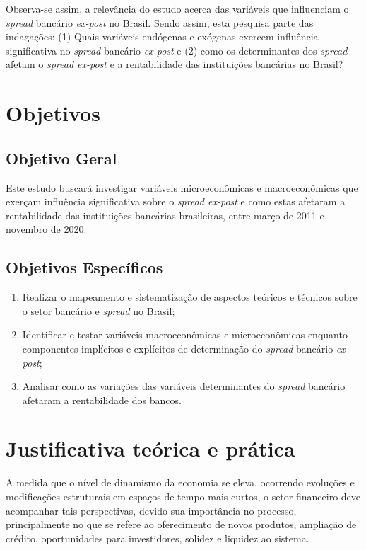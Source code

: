 \documentclass[
  12pt,
  12pt,
  openright,
  oneside,
  a4paper,
  chapter=TITLE,
  section=TITLE,
  subsection=TITLE,
  subsubsection=TITLE,
  portugues,
  sumario=tradicional]{abntex2}
\providecommand{\tightlist}{%
  \setlength{\itemsep}{0pt}\setlength{\parskip}{0pt}}
\begin{document}
Observa-se assim, a relevância do estudo acerca das variáveis que influenciam o \emph{spread} bancário \emph{ex-post} no Brasil. Sendo assim, esta pesquisa parte das indagações: (1) Quais variáveis endógenas e exógenas exercem influência significativa no \emph{spread} bancário \emph{ex-post} e (2) como os determinantes dos \emph{spread} afetam o \emph{spread ex-post} e a rentabilidade das instituições bancárias no Brasil?

\section{Objetivos}

\subsection{Objetivo Geral}

Este estudo buscará investigar variáveis microeconômicas e macroeconômicas que exerçam influência significativa sobre o \emph{spread ex-post} e como estas afetaram a rentabilidade das instituições bancárias brasileiras, entre março de 2011 e novembro de 2020.

\subsection{Objetivos Específicos}

\begin{enumerate}
\def\labelenumi{\arabic{enumi}.}
\tightlist
\item
  Realizar o mapeamento e sistematização de aspectos teóricos e técnicos sobre o setor bancário e \emph{spread} no Brasil;
\item
  Identificar e testar variáveis macroeconômicas e microeconômicas enquanto componentes implícitos e explícitos de determinação do \emph{spread} bancário \emph{ex-post};
\item
  Analisar como as variações das variáveis determinantes do \emph{spread} bancário afetaram a rentabilidade dos bancos.
\end{enumerate}

\section{Justificativa teórica e prática}

A medida que o nível de dinamismo da economia se eleva, ocorrendo evoluções e modificações estruturais em espaços de tempo mais curtos, o setor financeiro deve acompanhar tais perspectivas, devido sua importância no processo, principalmente no que se refere ao oferecimento de novos produtos, ampliação de crédito, oportunidades para investidores, solidez e liquidez ao sistema.
\end{document}
